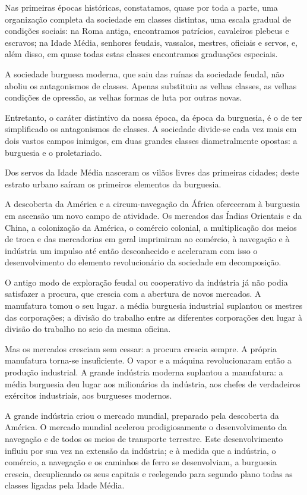Nas primeiras épocas históricas, constatamos, quase por toda a parte,
uma organização completa da sociedade em classes distintas, uma escala
gradual de condições sociais: na Roma antiga, encontramos patrícios,
cavaleiros plebeus e escravos; na Idade Média, senhores feudais,
vassalos, mestres, oficiais e servos, e, além disso, em quase todas
estas classes encontramos graduações especiais.

A sociedade burguesa moderna, que saiu das ruínas da sociedade feudal,
não aboliu os antagonismos de classes. Apenas substituiu as velhas
classes, as velhas condições de opressão, as velhas formas de luta por
outras novas.

Entretanto, o caráter distintivo da nossa época, da época da
burguesia, é o de ter simplificado os antagonismos de classes. A
sociedade divide-se cada vez mais em dois vastos campos inimigos, em
duas grandes classes diametralmente opostas: a burguesia e o
proletariado.

Dos servos da Idade Média nasceram os vilãos livres das primeiras
cidades; deste estrato urbano saíram os primeiros elementos da
burguesia.

A descoberta da América e a circum-navegação da África ofereceram à
burguesia em ascensão um novo campo de atividade. Os mercados das
Índias Orientais e da China, a colonização da América, o comércio
colonial, a multiplicação dos meios de troca e das mercadorias em
geral imprimiram ao comércio, à navegação e à indústria um impulso até
então desconhecido e aceleraram com isso o desenvolvimento do elemento
revolucionário da sociedade em decomposição.

O antigo modo de exploração feudal ou cooperativo da indústria já não
podia satisfazer a procura, que crescia com a abertura de novos
mercados. A manufatura tomou o seu lugar. a média burguesia industrial
suplantou os mestres das corporações; a divisão do trabalho entre as
diferentes corporações deu lugar à divisão do trabalho no seio da
mesma oficina.

Mas os mercados cresciam sem cessar: a procura crescia sempre. A
própria manufatura torna-se insuficiente. O vapor e a máquina
revolucionaram então a produção industrial. A grande indústria moderna
suplantou a manufatura: a média burguesia deu lugar aos milionários da
indústria, aos chefes de verdadeiros exércitos industriais, aos
burgueses modernos.

A grande indústria criou o mercado mundial, preparado pela descoberta
da América. O mercado mundial acelerou prodigiosamente o
desenvolvimento da navegação e de todos os meios de transporte
terrestre. Este desenvolvimento influiu por sua vez na extensão da
indústria; e à medida que a indústria, o comércio, a navegação e os
caminhos de ferro se desenvolviam, a burguesia crescia, decuplicando
os seus capitais e reelegendo para segundo plano todas as classes
ligadas pela Idade Média.

